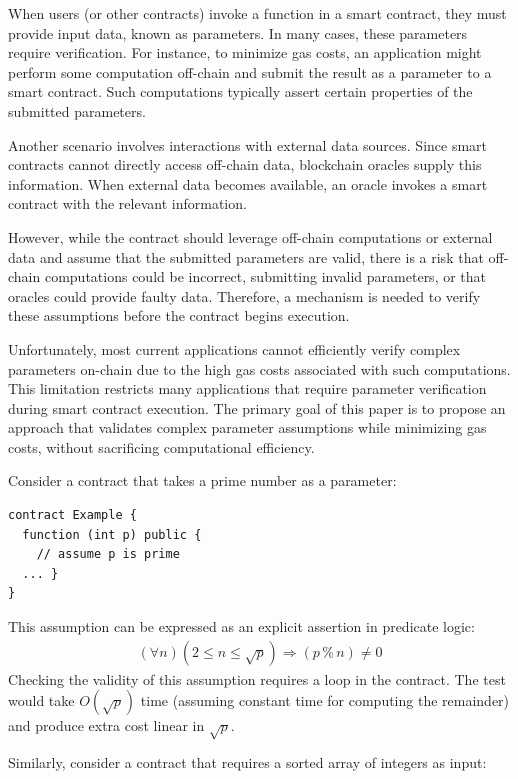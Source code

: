 \documentclass[runningheads]{llncs}
\begin{document}
When users (or other contracts) invoke a function in a smart contract, they must provide input data, known as parameters. In many cases, these parameters require verification. For instance, to minimize gas costs, an application might perform some computation off-chain and submit the result as a parameter to a smart contract. Such computations typically assert certain properties of the submitted parameters.

Another scenario involves interactions with external data sources. Since smart contracts cannot directly access off-chain data, blockchain oracles \cite{blockchain-oracles,oracle-patterns,astraea,chainlink-whitepaper} supply this information. When external data becomes available, an oracle invokes a smart contract with the relevant information.

However, while the contract should leverage off-chain computations or external data and assume that the submitted parameters are valid, there is a risk that off-chain computations could be incorrect, submitting invalid parameters, or that oracles could provide faulty data. Therefore, a mechanism is needed to verify these assumptions before the contract begins execution.

Unfortunately, most current applications cannot efficiently verify complex parameters on-chain due to the high gas costs associated with such computations. This limitation restricts many applications that require parameter verification during smart contract execution. The primary goal of this paper is to propose an approach that validates complex parameter assumptions while minimizing gas costs, without sacrificing computational efficiency.

Consider a contract that takes a prime number as a parameter:
\begin{lstlisting}[numbers=none]
contract Example {
  function (int p) public {
    // assume p is prime 
  ... }
}
\end{lstlisting}
This assumption can be expressed as an explicit assertion in predicate logic:
\begin{gather*}
\label{eq1}
  (\forall n) (2 \leq n \leq \sqrt{p}) \Rightarrow (p \mathbin{\%} n) \ne 0
\end{gather*}
Checking the validity of this assumption requires a loop in the contract. The test would take \(O(\sqrt{p})\) time (assuming constant time for computing the remainder) and produce extra cost linear in \(\sqrt{p}\).

Similarly, consider a contract that requires a sorted array of integers as input:
\end{document}
